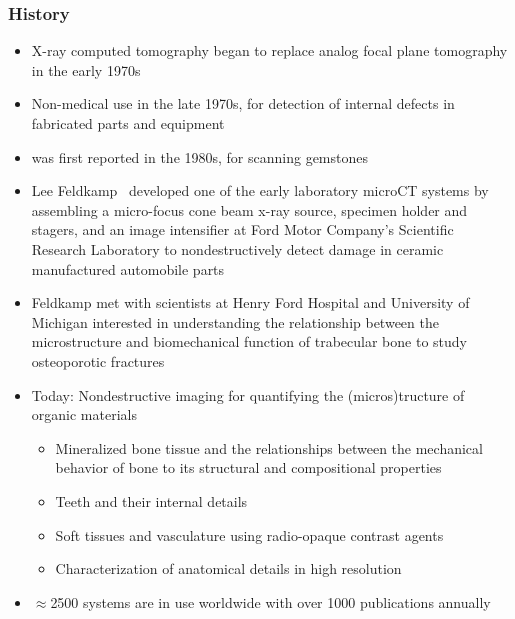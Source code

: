 \begin{frame}[allowframebreaks]
	\frametitle{\uct{} History}
			\begin{itemize}
				\item X-ray computed tomography began to replace analog focal plane tomography in the early 1970s~\cite{Lin2019}
				\item Non-medical use in the late 1970s, for detection of internal defects in fabricated parts and equipment
				\item \uct{} was first reported in the 1980s, for scanning gemstones
				\item Lee Feldkamp~\cite{Feldkamp1984} developed one of the early laboratory microCT systems by assembling a micro-focus cone beam x-ray source, specimen holder and stagers, and an image intensifier at Ford Motor Company’s Scientific Research Laboratory to nondestructively detect damage in ceramic manufactured automobile parts
				\item Feldkamp met with scientists at Henry Ford Hospital and University of Michigan interested in understanding the relationship between the microstructure and biomechanical function of trabecular bone to study osteoporotic fractures~\cite{Feldkamp1983}
				\item Today: Nondestructive imaging for quantifying the (micros)tructure of organic materials
				\begin{itemize}
					\item Mineralized bone tissue and the relationships between the mechanical behavior of bone to its structural and compositional properties
					\item Teeth and their internal details
					\item Soft tissues and vasculature using radio-opaque contrast agents
					\item Characterization of anatomical details in high resolution
				\end{itemize}
				\item \(\approx\)2500 \uct{} systems are in use worldwide with over 1000 publications annually
			\end{itemize}
\end{frame}

